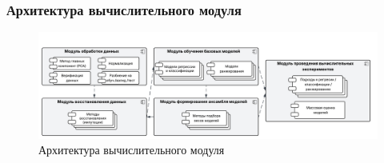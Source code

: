 \documentclass
  [ russian
  , aspectratio=169 %
  ] {beamer}
\begin{document}
\begin{frame}
    \frametitle{Архитектура вычислительного модуля}
    \begin{figure}
        \centering
        \includegraphics[width=1\linewidth]{figures/Arch_colored.png}
        \caption{Архитектура вычислительного модуля}
        \label{fig:archi}
    \end{figure}
\end{frame}
\end{document}
